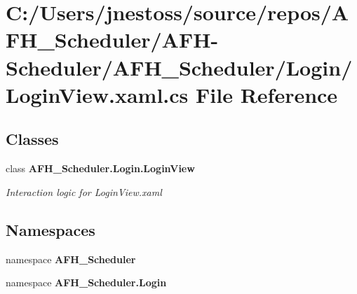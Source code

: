 \section{C\+:/\+Users/jnestoss/source/repos/\+A\+F\+H\+\_\+\+Scheduler/\+A\+F\+H-\/\+Scheduler/\+A\+F\+H\+\_\+\+Scheduler/\+Login/\+Login\+View.xaml.\+cs File Reference}
\label{_login_view_8xaml_8cs}
\subsection*{Classes}
\begin{DoxyCompactItemize}
\item 
class \textbf{ A\+F\+H\+\_\+\+Scheduler.\+Login.\+Login\+View}
\begin{DoxyCompactList}\small\item\em Interaction logic for Login\+View.\+xaml \end{DoxyCompactList}\end{DoxyCompactItemize}
\subsection*{Namespaces}
\begin{DoxyCompactItemize}
\item 
namespace \textbf{ A\+F\+H\+\_\+\+Scheduler}
\item 
namespace \textbf{ A\+F\+H\+\_\+\+Scheduler.\+Login}
\end{DoxyCompactItemize}

